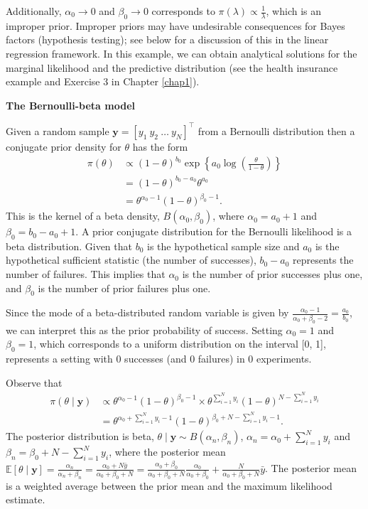 \begin{enumerate}
Additionally, \( \alpha_0 \to 0 \) and \( \beta_0 \to 0 \) corresponds to \( \pi(\lambda) \propto \frac{1}{\lambda} \), which is an improper prior. Improper priors may have undesirable consequences for Bayes factors (hypothesis testing); see below for a discussion of this in the linear regression framework. In this example, we can obtain analytical solutions for the marginal likelihood and the predictive distribution (see the health insurance example and Exercise 3 in Chapter \ref{chap1}).

\textbf{The Bernoulli-beta model}

Given a random sample $\bm{y}=[y_1 \ y_2 \ \dots \ y_N]^{\top}$ from a Bernoulli distribution then a conjugate prior density for $\theta$ has the form 
\begin{align}
	\pi(\theta)&\propto (1-\theta)^{b_0} \exp\left\{a_0\log\left(\frac{\theta}{1-\theta}\right)\right\}\nonumber\\
	& = (1-\theta)^{b_0-a_0}\theta^{a_0}\nonumber\\
	& = \theta^{\alpha_0-1}(1-\theta)^{\beta_0-1}.\nonumber
\end{align}
This is the kernel of a beta density, \( B(\alpha_0, \beta_0) \), where \( \alpha_0 = a_0 + 1 \) and \( \beta_0 = b_0 - a_0 + 1 \). A prior conjugate distribution for the Bernoulli likelihood is a beta distribution. Given that \( b_0 \) is the hypothetical sample size and \( a_0 \) is the hypothetical sufficient statistic (the number of successes), \( b_0 - a_0 \) represents the number of failures. This implies that \( \alpha_0 \) is the number of prior successes plus one, and \( \beta_0 \) is the number of prior failures plus one.

Since the mode of a beta-distributed random variable is given by \( \frac{\alpha_0 - 1}{\alpha_0 + \beta_0 - 2} = \frac{a_0}{b_0} \), we can interpret this as the prior probability of success. Setting \( \alpha_0 = 1 \) and \( \beta_0 = 1 \), which corresponds to a uniform distribution on the interval [0, 1], represents a setting with 0 successes (and 0 failures) in 0 experiments. 

Observe that
\begin{align}
	\pi(\theta\mid \bm{y})&\propto \theta^{\alpha_0-1}(1-\theta)^{\beta_0-1} \times \theta^{\sum_{i=1}^N y_i}(1-\theta)^{N-\sum_{i=1}^Ny_i}\nonumber\\
	&= \theta^{\alpha_0+\sum_{i=1}^N y_i-1}(1-\theta)^{\beta_0+N-\sum_{i=1}^Ny_i-1}.\nonumber 
\end{align}
The posterior distribution is beta, $\theta\mid \bm{y}\sim B(\alpha_n,\beta_n)$, $\alpha_n=\alpha_0+\sum_{i=1}^N y_i$ and $\beta_n=\beta_0+N-\sum_{i=1}^Ny_i$, where the posterior mean $\mathbb{E}[\theta\mid \bm{y}]=\frac{\alpha_n}{\alpha_n+\beta_n}=\frac{\alpha_0+N\bar{y}}{\alpha_0+\beta_0+N}=\frac{\alpha_0+\beta_0}{\alpha_0+\beta_0+N}\frac{\alpha_0}{\alpha_0+\beta_0}+\frac{N}{\alpha_0+\beta_0+N}\bar{y}$. The posterior mean is a weighted average between the prior mean and the maximum likelihood estimate.


\end{enumerate}
